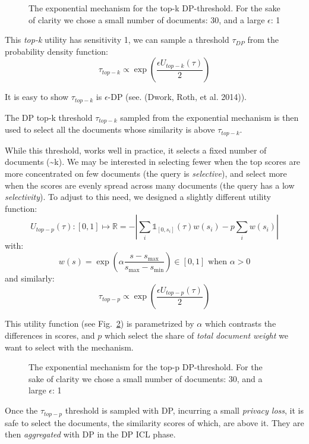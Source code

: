 \documentclass[
  12pt,
  a4paper,
]{article}
\begin{document}
\begin{figure}
\centering

\caption{The exponential mechanism for the top-k DP-threshold. For the
sake of clarity we chose a small number of documents: 30, and a large
\(\epsilon\): 1}\label{fig:topkexp}
\end{figure}

This \emph{top-k} utility has sensitivity 1, we can sample a threshold
\(\tau_{DP}\) from the probability density function:
\[\tau_{top-k}\propto\exp\left(\frac{\epsilon U_{top-k}(\tau)}{2}\right)\]

It is easy to show \(\tau_{top-k}\) is \(\epsilon\)-DP (see. (Dwork,
Roth, et al. 2014)).

The DP top-k threshold \(\tau_{top-k}\) sampled from the exponential
mechanism is then used to select all the documents whose similarity is
above \(\tau_{top-k}\).

While this threshold, works well in practice, it selects a fixed number
of documents (\textasciitilde k). We may be interested in selecting
fewer when the top scores are more concentrated on few documents (the
query is \emph{selective}), and select more when the scores are evenly
spread across many documents (the query has a low \emph{selectivity}).
To adjust to this need, we designed a slightly different utility
function:
\[U_{top-p}(\tau): [0, 1] \mapsto \mathbb{R} = -\left|\sum_i\mathbb{1}_{[0, s_i]}(\tau)w(s_i)-p\sum_i w(s_i)\right|\]
with:
\[w(s) = \exp\left(\alpha\frac{s-s_{\max}}{s_{\max}-s_{\min}}\right) \in [0, 1] \text{ when } \alpha>0\]
and similarly:
\[\tau_{top-p}\propto\exp\left(\frac{\epsilon U_{top-p}(\tau)}{2}\right)\]

This utility function (see Fig.~\ref{fig:toppexp}) is parametrized by
\(\alpha\) which contrasts the differences in scores, and \(p\) which
select the share of \emph{total document weight} we want to select with
the mechanism.

\begin{figure}
\centering

\caption{The exponential mechanism for the top-p DP-threshold. For the
sake of clarity we chose a small number of documents: 30, and a large
\(\epsilon\): 1}\label{fig:toppexp}
\end{figure}

Once the \(\tau_{top-p}\) threshold is sampled with DP, incurring a
small \emph{privacy loss}, it is safe to select the documents, the
similarity scores of which, are above it. They are then
\emph{aggregated} with DP in the DP ICL phase.
\end{document}
